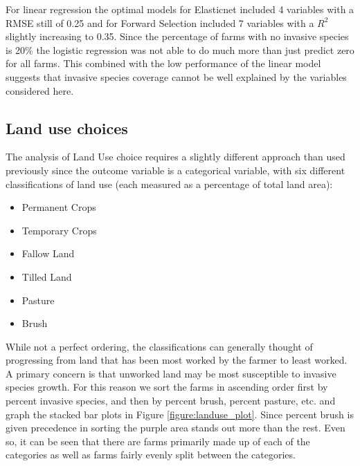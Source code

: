 \documentclass{article}
\begin{document}
For linear regression the optimal models for Elasticnet included 4 variables with a RMSE still of 0.25 and for Forward Selection 
included 7 variables with a $R^2$ slightly increasing to 0.35.  Since the percentage of farms with no invasive species is 20{\%} 
the logistic regression was not able to do much more than just predict zero for all farms. This combined with the low 
performance of the linear model suggests that invasive species coverage cannot be well explained by the variables considered 
here.

\subsection{Land use choices}

The analysis of Land Use choice requires a slightly different approach than used previously since the outcome variable is a 
categorical variable, with six different classifications of land use (each measured as a percentage of total land area):
\begin{itemize}
	\item{Permanent Crops}
	\item{Temporary Crops}
	\item{Fallow Land}
	\item{Tilled Land}
	\item{Pasture}
	\item{Brush}
\end{itemize}

While not a perfect ordering, the classifications can generally thought of progressing from land that has been most worked by 
the farmer to least worked. A primary concern is that unworked land may be most susceptible to invasive species growth. For 
this reason we sort the farms in ascending order first by percent invasive species, and then by percent brush, percent pasture, 
etc. and graph the stacked bar plots in Figure \ref{figure:landuse_plot}. Since percent brush is given precedence in sorting the 
purple area stands out more than the rest. Even so, it can be seen that there are farms primarily made up of each of the 
categories as well as farms fairly evenly split between the categories.
\end{document}
